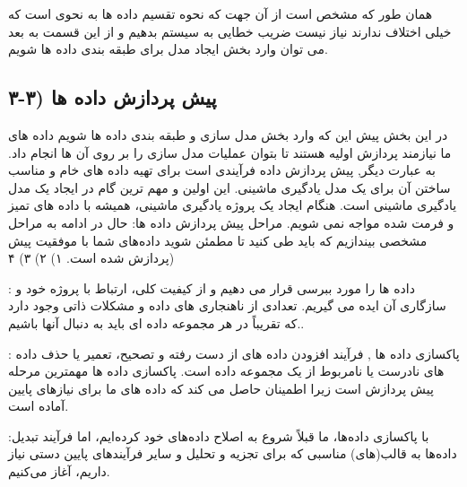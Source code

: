 \documentclass{article}
\begin{document}
همان طور که مشخص است از آن جهت که نحوه تقسیم داده ها به نحوی است که خیلی اختلاف ندارند نیاز نیست ضریب خطایی به سیستم بدهیم و از این قسمت به بعد می توان وارد بخش ایجاد مدل برای طبقه بندی داده ها شویم.
\subsection{۳-۳) پیش پردازش داده ها}
در این بخش پیش این که وارد بخش مدل سازی و طبقه بندی داده ها شویم داده های ما نیازمند پردازش اولیه هستند تا بتوان عملیات مدل سازی را بر روی آن ها انجام داد. به عبارت دیگر, پیش پردازش داده فرآیندی است برای تهیه داده های خام و مناسب ساختن آن برای یک مدل یادگیری ماشینی. این اولین و مهم ترین گام در ایجاد یک مدل یادگیری ماشینی است. هنگام ایجاد یک پروژه یادگیری ماشینی، همیشه با داده های تمیز و فرمت شده مواجه نمی شویم.\newline
مراحل پیش پردازش داده ها: حال در ادامه  به مراحل مشخصی بیندازیم که باید طی کنید تا مطمئن شوید داده‌های شما با موفقیت پیش پردازش شده است.\newline
۱)  \newline
۲)  \newline
۳)  \newline
۴)  \newline


  : داده ‌ها را مورد ببرسی قرار می دهیم و از کیفیت کلی، ارتباط با پروژه خود و سازگاری آن ایده می گیریم. تعدادی از ناهنجاری های داده و مشکلات ذاتی وجود دارد که تقریباً در هر مجموعه داده ای باید به دنبال آنها باشیم..\newline
 
 
  : پاکسازی داده ها , فرآیند افزودن داده های از دست رفته و تصحیح، تعمیر یا حذف داده های نادرست یا نامربوط از یک مجموعه داده است. پاکسازی داده ها مهمترین مرحله پیش پردازش است زیرا اطمینان حاصل می کند که داده های ما برای نیازهای پایین آماده است. \newline
 
 
   :با پاکسازی داده‌ها، ما قبلاً شروع به اصلاح داده‌های خود کرده‌ایم، اما فرآیند تبدیل داده‌ها به قالب(های) مناسبی که برای تجزیه و تحلیل و سایر فرآیندهای پایین دستی نیاز داریم، آغاز می‌کنیم. \newline
  
\end{document}
